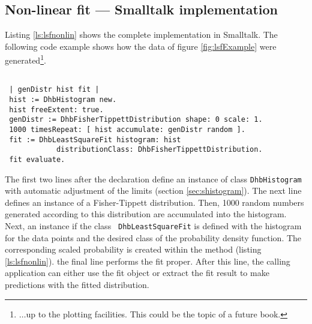 \documentclass[twoside]{book}
\begin{document}
\subsection{Non-linear fit --- Smalltalk implementation}
\label{sec:slsfnonlin}Listing \ref{ls:lsfnonlin} shows the
complete implementation in Smalltalk. The following code example
shows how the data of figure \ref{fig:lsfExample} were
generated\footnote{$\ldots$up to the plotting facilities. This
could be the topic of a future book.}.
\begin{codeExample}
\label{exs:leastSquare}
\begin{verbatim}

 | genDistr hist fit |
 hist := DhbHistogram new.
 hist freeExtent: true.
 genDistr := DhbFisherTippettDistribution shape: 0 scale: 1.
 1000 timesRepeat: [ hist accumulate: genDistr random ].
 fit := DhbLeastSquareFit histogram: hist
            distributionClass: DhbFisherTippettDistribution.
 fit evaluate.
\end{verbatim}
\end{codeExample}
The first two lines after the declaration define an instance of
class {\tt DhbHistogram} with automatic adjustment of the limits
(\cf section \ref{sec:shistogram}). The next line defines an
instance of a Fisher-Tippett distribution. Then, 1000 random
numbers generated according to this distribution are accumulated
into the histogram. Next, an instance if the class {\tt
DhbLeastSquareFit} is defined with the histogram for the data
points and the desired class of the probability density function.
The corresponding scaled probability is created within the method
(\cf listing \ref{ls:lsfnonlin}). the final line performs the fit
proper. After this line, the calling application can either use
the fit object or extract the fit result to make predictions with
the fitted distribution.
\end{document}
